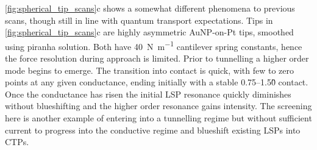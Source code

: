 \documentclass[a4paper, 11pt]{article}
\begin{document}
\autoref{fig:spherical_tip_scans}c shows a somewhat different phenomena to previous scans, though still in line with quantum transport expectations. Tips in \autoref{fig:spherical_tip_scans}c are highly asymmetric AuNP-on-Pt tips, smoothed using piranha solution. Both have \SI{40}{N.m^{-1}} cantilever spring constants, hence the force resolution during approach is limited. Prior to tunnelling a higher order mode begins to emerge. The transition into contact is quick, with few to zero points at any given conductance, ending initially with a stable 0.75--1.5\G0 contact.
Once the conductance has risen the initial LSP resonance quickly diminishes without blueshifting and the higher order resonance gains intensity. The screening here is another example of entering into a tunnelling regime but without sufficient current to progress into the conductive regime and blueshift existing LSPs into CTPs.
\end{document}
